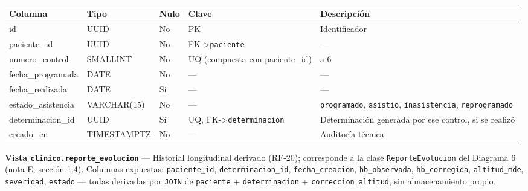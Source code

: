 \documentclass[11pt,a4paper]{article}
\begin{document}
{\small
\begin{longtable}[]{@{}
  >{\raggedright\arraybackslash}p{}
  >{\raggedright\arraybackslash}p{}
  >{\raggedright\arraybackslash}p{}
  >{\raggedright\arraybackslash}p{}
  >{\raggedright\arraybackslash}p{}@{}}
\toprule\noalign{}
\begin{minipage}[b]{\linewidth}\raggedright
Columna
\end{minipage} & \begin{minipage}[b]{\linewidth}\raggedright
Tipo
\end{minipage} & \begin{minipage}[b]{\linewidth}\raggedright
Nulo
\end{minipage} & \begin{minipage}[b]{\linewidth}\raggedright
Clave
\end{minipage} & \begin{minipage}[b]{\linewidth}\raggedright
Descripción
\end{minipage} \\
\midrule\noalign{}
\endhead
\bottomrule\noalign{}
\endlastfoot
id & UUID & No & PK & Identificador \\
paciente\_id & UUID & No & FK-\textgreater{}\texttt{paciente} & --- \\
numero\_control & SMALLINT & No & UQ (compuesta con paciente\_id) & 1 a 6 \\
fecha\_programada & DATE & No & --- & --- \\
fecha\_realizada & DATE & Sí & --- & --- \\
estado\_asistencia & VARCHAR(15) & No & --- & \texttt{programado}, \texttt{asistio}, \texttt{inasistencia}, \texttt{reprogramado} \\
determinacion\_id & UUID & Sí & UQ, FK-\textgreater{}\texttt{determinacion} & Determinación generada por ese control, si se realizó \\
creado\_en & TIMESTAMPTZ & No & --- & Auditoría técnica \\
\end{longtable}
}

\textbf{Vista \texttt{clinico.reporte\_evolucion}} --- Historial longitudinal derivado (RF-20); corresponde a la clase \texttt{ReporteEvolucion} del Diagrama 6 (nota E, sección 1.4). Columnas expuestas: \texttt{paciente\_id}, \texttt{determinacion\_id}, \texttt{fecha\_creacion}, \texttt{hb\_observada}, \texttt{hb\_corregida}, \texttt{altitud\_mde}, \texttt{severidad}, \texttt{estado} --- todas derivadas por \texttt{JOIN} de \texttt{paciente} + \texttt{determinacion} + \texttt{correccion\_altitud}, sin almacenamiento propio.
\end{document}
